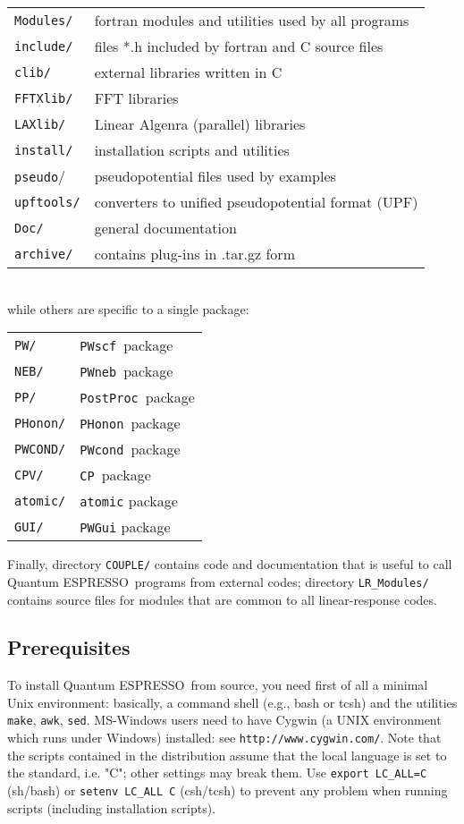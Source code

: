 \documentclass[12pt,a4paper]{article}
\def\qe{{\sc Quantum ESPRESSO}}
\def\PWscf{\texttt{PWscf}}
\def\PHonon{\texttt{PHonon}}
\def\CP{\texttt{CP}}
\def\PostProc{\texttt{PostProc}}
\def\NEB{\texttt{PWneb}} %
\def\make{\texttt{make}}
\begin{document}
\begin{tabular}{ll}
\texttt{Modules/} &  fortran modules and utilities used by all programs\\
\texttt{include/} &  files *.h included by fortran and C source files\\
\texttt{clib/}    &  external libraries written in C\\
\texttt{FFTXlib/} &  FFT libraries\\
\texttt{LAXlib/}  &  Linear Algenra (parallel) libraries\\
\texttt{install/} &  installation scripts and utilities\\
\texttt{pseudo}/  &  pseudopotential files used by examples\\
\texttt{upftools/}&  converters to unified pseudopotential format (UPF)\\
\texttt{Doc/}     &  general documentation\\
\texttt{archive/} &  contains plug-ins in .tar.gz form\\
\end{tabular}
\\
while others are specific to a single package:

\begin{tabular}{ll}
\texttt{PW/}      & \PWscf\ package\\
\texttt{NEB/}     & \NEB\ package\\
\texttt{PP/}      & \PostProc\ package\\
\texttt{PHonon/}  & \PHonon\ package\\
\texttt{PWCOND/}  & \texttt{PWcond}\ package\\
\texttt{CPV/}     & \CP\ package\\
\texttt{atomic/}  & \texttt{atomic} package\\
\texttt{GUI/}     & \texttt{PWGui} package\
\end{tabular}

Finally, directory \texttt{COUPLE/} contains code and documentation
that is useful to call \qe\ programs from external codes; directory
\texttt{LR\_Modules/} contains source files for modules that are common
to all linear-response codes.
\subsection{Prerequisites}
\label{Sec:Installation}

To install \qe\ from source, you need first of all a minimal Unix
environment: basically, a command shell (e.g.,
bash or tcsh) and the utilities \make, \texttt{awk}, \texttt{sed}.
 MS-Windows users need to have Cygwin (a UNIX environment which
 runs under Windows) installed:
see \texttt{http://www.cygwin.com/}. Note that the scripts contained
in the distribution assume that the local  language is set to the
standard, i.e. "C"; other settings
may break them. Use \texttt{export LC\_ALL=C} (sh/bash) or
\texttt{setenv LC\_ALL C} (csh/tcsh) to prevent any problem
when running scripts (including installation scripts).
\end{document}
